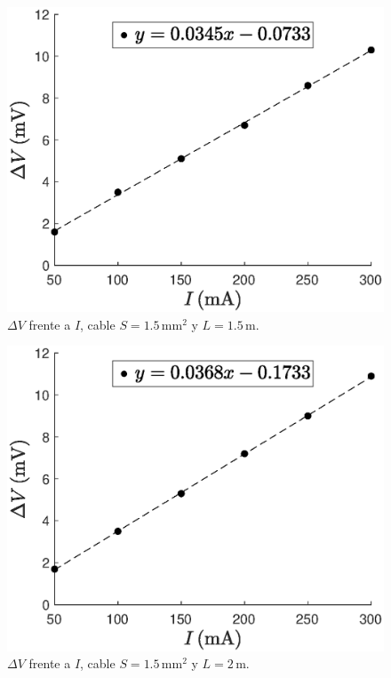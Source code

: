 \begin{figure}[h!]
    \begin{center}
        \includegraphics[width=0.8\columnwidth]{files/images/S1L2}
    \end{center}
    \caption{$\Delta V$ frente a $I$, cable $S = 1.5\,$mm$^2$ y $L = 1.5\,$m.}
    \label{fig:S1L2}
\end{figure}

\begin{figure}[h!]
    \begin{center}
        \includegraphics[width=0.8\columnwidth]{files/images/S1L3}
    \end{center}
    \caption{$\Delta V$ frente a $I$, cable $S = 1.5\,$mm$^2$ y $L = 2\,$m.}
    \label{fig:S1L3}
\end{figure}

